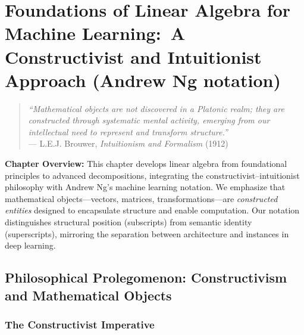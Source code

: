 \chapter{Foundations of Linear Algebra for Machine Learning:\
A Constructivist and Intuitionist Approach (Andrew Ng notation)}

\begin{quote}
    \emph{``Mathematical objects are not discovered in a Platonic realm; they are constructed through systematic mental activity, emerging from our intellectual need to represent and transform structure.''}\\
    \hfill--- L.E.J. Brouwer, \textit{Intuitionism and Formalism} (1912)
\end{quote}

\vspace{1em}

\noindent\textbf{Chapter Overview:} This chapter develops linear algebra from foundational principles to advanced decompositions, integrating the constructivist--intuitionist philosophy with Andrew Ng's machine learning notation. We emphasize that mathematical objects—vectors, matrices, transformations—are \textit{constructed entities} designed to encapsulate structure and enable computation. Our notation distinguishes structural position (subscripts) from semantic identity (superscripts), mirroring the separation between architecture and instances in deep learning.

\section{Philosophical Prolegomenon: Constructivism and Mathematical Objects}

\subsection{The Constructivist Imperative}

